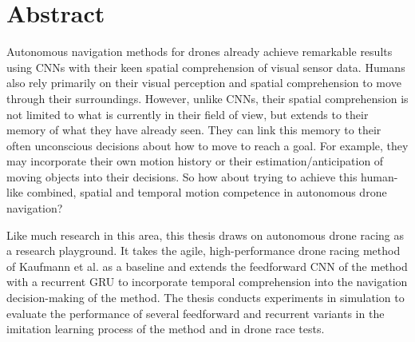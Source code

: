 \chapter*{Abstract}
Autonomous navigation methods for drones already achieve 
remarkable results using CNNs with their keen spatial comprehension 
of visual sensor data. 
Humans also rely primarily on their visual perception and spatial comprehension to move through their surroundings. 
However, unlike CNNs, their spatial comprehension 
is not limited to what is currently in their field of view, 
but extends to their memory of what they have already seen. 
They can link this memory to their often unconscious decisions 
about how to move to reach a goal. 
For example, they may incorporate their own motion history 
or their estimation/anticipation of moving objects into their decisions.
So how about trying to achieve this human-like combined, 
spatial and temporal motion competence in autonomous drone navigation?

Like much research in this area, 
this thesis draws on autonomous drone racing as a research playground. 
It takes the agile, high-performance drone racing method of Kaufmann et al. \cite{Kaufmann2018}
as a baseline and extends the feedforward CNN of the method
with a recurrent GRU to incorporate temporal comprehension 
into the navigation decision-making of the method. 
The thesis conducts experiments in simulation 
to evaluate the performance of several feedforward and recurrent variants 
in the imitation learning process of the method and in drone race tests.

